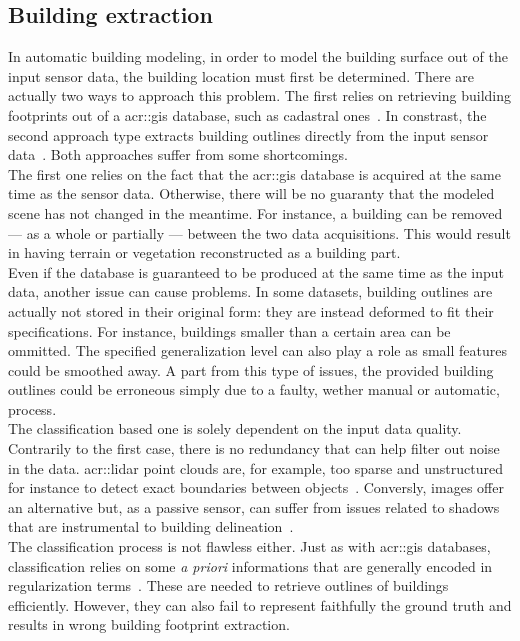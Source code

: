     \subsection{Building extraction}
        \label{subsec::state_of_the_art::building_modeling::building_extraction}
        In automatic building modeling, in order to model the building surface out of the input sensor data, the building location must first be determined.
        There are actually two ways to approach this problem.
        The first relies on retrieving building footprints out of a \gls{acr::gis} database, such as cadastral ones~\parencite{taillandier2004automatic,durupt2006automatic,horna2007building,ledoux2011topologically,biljecki2017generating,biljecki2019raise}.
        In constrast, the second approach type extracts building outlines directly from the input sensor data~\parencite{poullis2009automatic,lafarge2012creating,nguatem2017modeling,zhu2018large}.
        Both approaches suffer from some shortcomings.\\

        The first one relies on the fact that the \gls{acr::gis} database is acquired at the same time as the sensor data.
        Otherwise, there will be no guaranty that the modeled scene has not changed in the meantime.
        For instance, a building can be removed --- as a whole or partially --- between the two data acquisitions.
        This would result in having terrain or vegetation reconstructed as a building part.\\
        Even if the database is guaranteed to be produced at the same time as the input data, another issue can cause problems.
        In some datasets, building outlines are actually not stored in their original form: they are instead deformed to fit their specifications.
        For instance, buildings smaller than a certain area can be ommitted.
        The specified generalization level can also play a role as small features could be smoothed away.
        A part from this type of issues, the provided building outlines could be erroneous simply due to a faulty, wether manual or automatic, process.\\
        
        The classification based one is solely dependent on the input data quality.
        Contrarily to the first case, there is no redundancy that can help filter out noise in the data.
        \Gls{acr::lidar} point clouds are, for example, too sparse and unstructured for instance to detect exact boundaries between objects~\parencite{michelin2012building}.
        Conversly, images offer an alternative but, as a passive sensor, can suffer from issues related to shadows that are instrumental to building delineation~\parencite{adeline2013shadow}.\\
        The classification process is not flawless either.
        Just as with \gls{acr::gis} databases, classification relies on some \textit{a priori} informations that are generally encoded in regularization terms~\parencite{lafarge2008structural,zhu2018large,zeng2018neural}.
        These are needed to retrieve outlines of buildings efficiently.
        However, they can also fail to represent faithfully the ground truth and results in wrong building footprint extraction.

